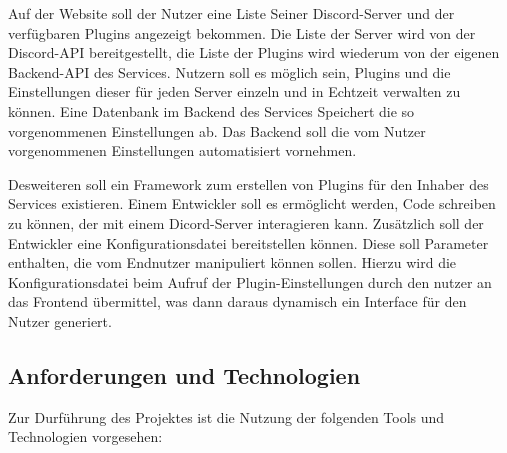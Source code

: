Auf der Website soll der Nutzer eine Liste Seiner Discord-Server und der verfügbaren Plugins angezeigt bekommen. Die Liste der Server wird von der Discord-API bereitgestellt, die Liste der Plugins wird wiederum von der eigenen Backend-API des Services. Nutzern soll es möglich sein, Plugins und die Einstellungen dieser für jeden Server einzeln und in Echtzeit verwalten zu können. Eine Datenbank im Backend des Services Speichert die so vorgenommenen Einstellungen ab. Das Backend soll die vom Nutzer vorgenommenen Einstellungen automatisiert vornehmen. 

Desweiteren soll ein Framework zum erstellen von Plugins für den Inhaber des Services existieren. Einem Entwickler soll es ermöglicht werden, Code schreiben zu können, der mit einem Dicord-Server interagieren kann. Zusätzlich soll der Entwickler eine Konfigurationsdatei bereitstellen können. Diese soll Parameter enthalten, die vom Endnutzer manipuliert können sollen. Hierzu wird die Konfigurationsdatei beim Aufruf der Plugin-Einstellungen durch den nutzer an das Frontend übermittel, was dann daraus dynamisch ein Interface für den Nutzer generiert.

\subsection{Anforderungen und Technologien}\label{anforderungen-und-technologien}
Zur Durführung des Projektes ist die Nutzung der folgenden Tools und Technologien vorgesehen:

